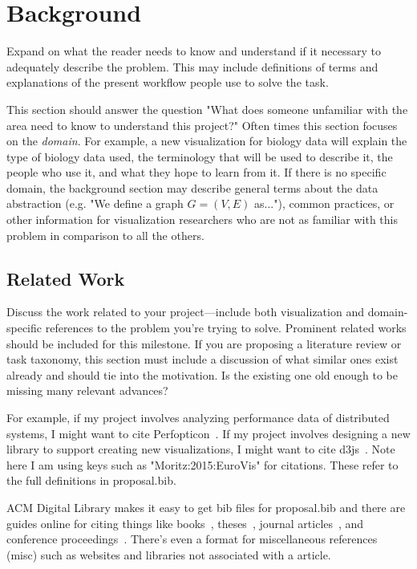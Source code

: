 
\section{Background}
\label{sec:background}

Expand on what the reader needs to know and understand if it necessary to
adequately describe the problem. This may include definitions of terms and
explanations of the present workflow people use to solve the task.

This section should answer the question "What does someone unfamiliar with the
area need to know to understand this project?" Often times this section focuses
on the \textit{domain}. For example, a new visualization for biology data will
explain the type of biology data used, the terminology that will be used to
describe it, the people who use it, and what they hope to learn from it. If
there is no specific domain, the background section may describe general terms
about the data abstraction (e.g. "We define a graph $G = (V, E)$ as..."),
common practices, or other information for visualization researchers who are
not as familiar with this problem in comparison to all the others. 

\subsection{Related Work}
\label{sec:related}

Discuss the work related to your project---include both visualization and
domain-specific references to the problem you're trying to solve. Prominent
related works should be included for this milestone. If you are proposing a
literature review or task taxonomy, this section must include a discussion of
what similar ones exist already and should tie into the motivation. Is the
existing one old enough to be missing many relevant advances?

For example, if my project involves analyzing performance data of distributed
systems, I might want to cite Perfopticon~\cite{Moritz:2015:EuroVis}. If my
project involves designing a new library to support creating new
visualizations, I might want to cite d3js~\cite{d3js}. Note here I am using
keys such as "Moritz:2015:EuroVis" for citations. These refer to the full
definitions in proposal.bib.

ACM Digital Library makes it easy to get bib files for proposal.bib and there
are guides online for citing things like books~\cite{ware:2004:IVP},
theses~\cite{levoy:1989:DSV}, journal articles~\cite{Lorensen:1987:MCA}, and
conference proceedings~\cite{Nielson:1991:TAD}. There's even a format for
miscellaneous references (misc) such as websites and libraries not associated
with a article.

